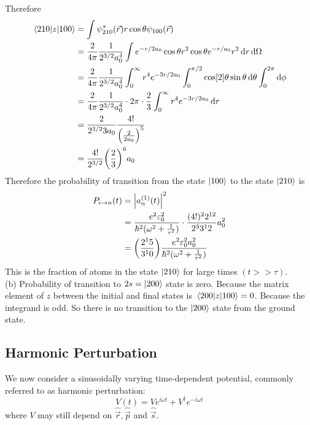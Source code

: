 Therefore
\begin{align*}
\mel{2 1 0}{z}{1 0 0}
&= \int \psi^*_{2 1 0}(\vec{r}) r\cos\theta \psi_{1 0 0}(\vec{r}) \\
&= \frac{2}{4\pi} \frac{1}{2^{3/2} a_0^4} \int e^{- r / 2 a_0} \cos\theta r^2 \cos\theta e^{-r/a_0} r^2 \dd{r}\dd{\Omega} \\
&= \frac{2}{4\pi} \frac{1}{2^{3/2} a_0^4} \int_0^\infty r^4 e^{-3 r/2 a_0} \int_{0}^{\pi/2} \cos[2]{\theta} \sin\theta\dd{\theta} \int_{0}^{2 \pi} \dd{\phi} \\
&= \frac{2}{4\pi} \frac{1}{2^{3/2} a_0^4} \cdot 2\pi \cdot \frac{2}{3} \int_{0}^{\infty} r^4 e^{-3 r/2 a_0} \dd{r} \\
&= \frac{2}{2^{3/2} 3 a_0} \frac{4!}{\qty(\frac{2}{2 a_0})^5} \\
&= \frac{4!}{2^{3/2}} \qty(\frac{2}{3})^6 a_0
\end{align*}
Therefore the probability of transition from the state $\ket{1 0 0}$ to the state $\ket{2 1 0}$ is 
\begin{align*}
P_{i \rightarrow n}(t) 
&= \abs{a_n^{(1)}(t)}^2 \\
&= \frac{e^2 \varepsilon_0^2}{\hbar^2 (\omega^2 + \frac{1}{\tau^2})} \cdot \frac{(4!)^2 2^{12}}{2^3 3^12} a_0 ^2 \\
&= \qty(\frac{2^15}{3^10}) \frac{e^2 \varepsilon_0^2 a_0^2}{\hbar^2 (\omega^2 + \frac{1}{\tau^2})} 
\end{align*}
This is the fraction of atoms in the state $\ket{2 1 0}$ for large times $(t >> \tau)$.\\

(b) Probability of transition to $2 s = \ket{2 0 0}$ state is zero. Because the matrix  element of $z$ between the initial and final states is $\mel{2 0 0}{z}{1 0 0} = 0$. Because the integrand is odd. So there is no transition to the $\ket{2 0 0}$ state from the ground state.




\subsection{Harmonic Perturbation}
We now consider a sinusoidally varying time-dependent potential, commonly referred to as harmonic perturbation:
\begin{equation}
\label{chapter23.eqn1-harmonic}
V(t) = V e^{i \omega t} + V^\dagger e^{-i \omega t}
\end{equation}
where $V$ may still depend on $\hat{\vec{r}}, \hat{\vec{p}}$ and $\hat{\vec{s}}$. 

